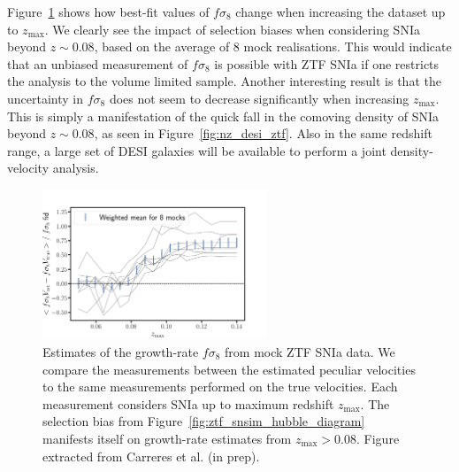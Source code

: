 Figure~\ref{fig:ztf_snsim_fs8_bias} shows how best-fit values of $f\sigma_8$ change when 
increasing the dataset up to $z_\text{max}$. We clearly see the impact of selection biases 
when considering SNIa beyond $z\sim 0.08$, based on the average of 8 mock realisations. 
This would indicate that an unbiased measurement of $f\sigma_8$ is possible with ZTF SNIa
if one restricts the analysis to the volume limited sample. 
Another interesting result is that the uncertainty in $f\sigma_8$ does not seem to 
decrease significantly when increasing $z_\text{max}$. This is simply a manifestation 
of the quick fall in the comoving density of SNIa beyond $z\sim0.08$, as seen in 
Figure~\ref{fig:nz_desi_ztf}. 
Also in the same redshift range, a large set of DESI galaxies will be available to 
perform a joint density-velocity analysis. 

\begin{figure}[t]
    \centering
    \includegraphics[width=0.6\textwidth]{fig/velocities/bastien_fs8_bias.pdf}
    \caption{Estimates of the growth-rate $f\sigma_8$ from mock ZTF SNIa data. 
    We compare the measurements between the estimated peculiar velocities to the 
    same measurements performed on the true velocities. 
    Each measurement considers SNIa up to maximum redshift $z_\text{max}$.
    The selection bias from Figure~\ref{fig:ztf_snsim_hubble_diagram} manifests itself
    on growth-rate estimates from $z_\text{max}>0.08$. 
    Figure extracted from Carreres et al. (in prep).}
    \label{fig:ztf_snsim_fs8_bias}
\end{figure}

